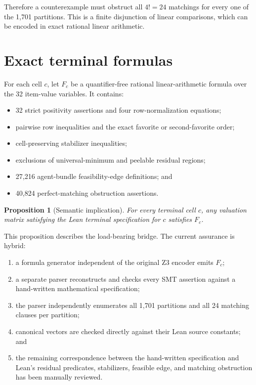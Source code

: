 \documentclass[11pt]{article}
\newtheorem{proposition}[theorem]{Proposition}
\theoremstyle{definition}
\begin{document}
Therefore a counterexample must obstruct all $4!=24$ matchings for every one
of the 1,701 partitions. This is a finite disjunction of linear comparisons,
which can be encoded in exact rational linear arithmetic.

\section{Exact terminal formulas}\label{sec:formulas}

For each cell $c$, let $F_c$ be a quantifier-free rational
linear-arithmetic formula over the 32 item-value variables. It contains:
\begin{itemize}[leftmargin=1.8em]
  \item 32 strict positivity assertions and four row-normalization equations;
  \item pairwise row inequalities and the exact favorite or second-favorite
  order;
  \item cell-preserving stabilizer inequalities;
  \item exclusions of universal-minimum and peelable residual regions;
  \item 27,216 agent-bundle feasibility-edge definitions; and
  \item 40,824 perfect-matching obstruction assertions.
\end{itemize}

\begin{proposition}[Semantic implication]\label{prop:semantic}
For every terminal cell $c$, any valuation matrix satisfying the Lean
terminal specification for $c$ satisfies $F_c$.
\end{proposition}

This proposition describes the load-bearing bridge. The current assurance is
hybrid:
\begin{enumerate}[leftmargin=2.1em]
  \item a formula generator independent of the original Z3 encoder emits
  $F_c$;
  \item a separate parser reconstructs and checks every SMT assertion against
  a hand-written mathematical specification;
  \item the parser independently enumerates all 1,701 partitions and all 24
  matching clauses per partition;
  \item canonical vectors are checked directly against their Lean source
  constants; and
  \item the remaining correspondence between the hand-written specification
  and Lean's residual predicates, stabilizers, feasible edge, and matching
  obstruction has been manually reviewed.
\end{enumerate}
\end{document}
